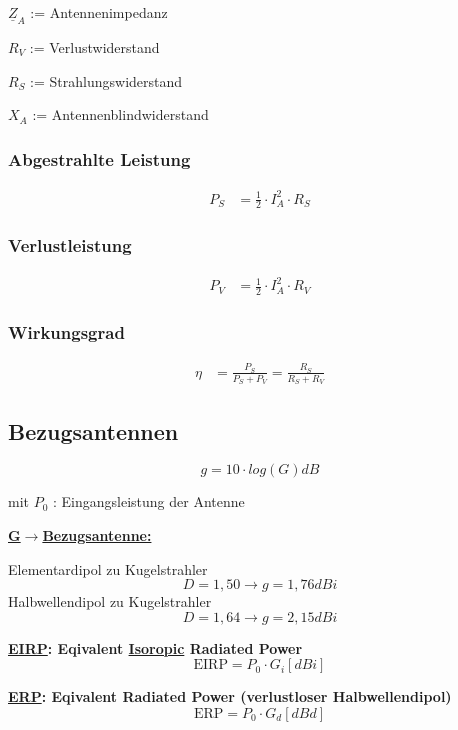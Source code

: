 $\underline{Z}_A$ := Antennenimpedanz

$R_V$ := Verlustwiderstand

$R_S$ := Strahlungswiderstand

$X_A$ := Antennenblindwiderstand

\subsubsection{Abgestrahlte Leistung}
\begin{align*}
    P_S & = \frac{1}{2}\cdot I_A^2 \cdot R_S
\end{align*}
\subsubsection{Verlustleistung}
\begin{align*}
    P_V & = \frac{1}{2}\cdot I_A^2\cdot R_V
\end{align*}
\subsubsection{Wirkungsgrad}
\begin{align*}
    \eta & = \frac{P_S}{P_S + P_V} = \frac{R_S}{R_S + R_V}
\end{align*}
\subsection{Bezugsantennen}
\[
    \boxed{g = 10 \cdot log(G)dB}
\]

mit $P_0$ : Eingangsleistung der Antenne

\begin{description}
    \item \textbf{\underline{G$\rightarrow$Bezugsantenne:}}

          Elementardipol  zu Kugelstrahler \[D = 1,50 \rightarrow g = 1,76\si{dBi}\]
          Halbwellendipol zu Kugelstrahler \[D = 1,64 \rightarrow g = 2,15\si{dBi}\]

    \item \textbf{\underline{EIRP}: Eqivalent \underline{Isoropic} Radiated Power}
          \[
              \text{EIRP} = P_0 \cdot G_i [dBi]
          \]

    \item \textbf{\underline{ERP}: Eqivalent Radiated Power (verlustloser Halbwellendipol)}
          \[
              \text{ERP} = P_0 \cdot G_d [dBd]
          \]
\end{description}

